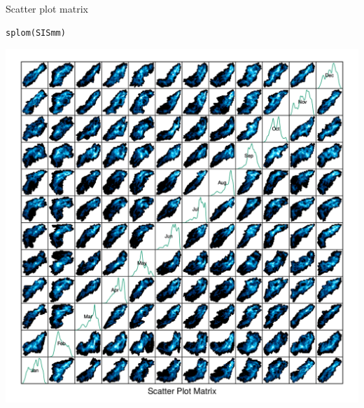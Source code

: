 \documentclass[xcolor={usenames,svgnames,dvipsnames}]{beamer}
\begin{document}
\begin{frame}[fragile,label=sec-14]{Scatter plot matrix}
 \lstset{language=R,numbers=none}
\begin{lstlisting}
splom(SISmm)
\end{lstlisting}

\begin{center}
\includegraphics[height=0.65\textheight]{figs/splom.png}
\end{center}
\end{frame}
\end{document}
